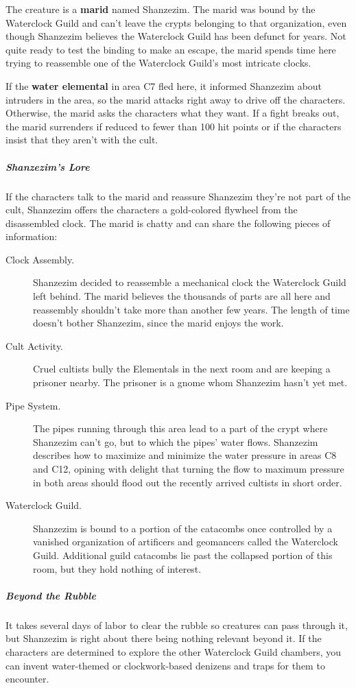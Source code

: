 \documentclass[10pt,a4paper,twoside,bg=print,twocolumn,openany,nodeprecatedcode]{dndbook}
\begin{document}
The creature is a \textbf{marid} named Shanzezim. The marid was bound by the Waterclock Guild and can't leave the crypts belonging to that organization, even though Shanzezim believes the Waterclock Guild has been defunct for years. Not quite ready to test the binding to make an escape, the marid spends time here trying to reassemble one of the Waterclock Guild's most intricate clocks.

If the \textbf{water elemental} in area C7 fled here, it informed Shanzezim about intruders in the area, so the marid attacks right away to drive off the characters. Otherwise, the marid asks the characters what they want. If a fight breaks out, the marid surrenders if reduced to fewer than 100 hit points or if the characters insist that they aren't with the cult.

\subparagraph{Shanzezim's Lore}
If the characters talk to the marid and reassure Shanzezim they're not part of the cult, Shanzezim offers the characters a gold-colored flywheel from the disassembled clock. The marid is chatty and can share the following pieces of information:


\begin{description}
\item[Clock Assembly.]
Shanzezim decided to reassemble a mechanical clock the Waterclock Guild left behind. The marid believes the thousands of parts are all here and reassembly shouldn't take more than another few years. The length of time doesn't bother Shanzezim, since the marid enjoys the work.
\item[Cult Activity.]
Cruel cultists bully the Elementals in the next room and are keeping a prisoner nearby. The prisoner is a gnome whom Shanzezim hasn't yet met.
\item[Pipe System.]
The pipes running through this area lead to a part of the crypt where Shanzezim can't go, but to which the pipes' water flows. Shanzezim describes how to maximize and minimize the water pressure in areas C8 and C12, opining with delight that turning the flow to maximum pressure in both areas should flood out the recently arrived cultists in short order.
\item[Waterclock Guild.]
Shanzezim is bound to a portion of the catacombs once controlled by a vanished organization of artificers and geomancers called the Waterclock Guild. Additional guild catacombs lie past the collapsed portion of this room, but they hold nothing of interest.
\end{description}

\subparagraph{Beyond the Rubble}
It takes several days of labor to clear the rubble so creatures can pass through it, but Shanzezim is right about there being nothing relevant beyond it. If the characters are determined to explore the other Waterclock Guild chambers, you can invent water-themed or clockwork-based denizens and traps for them to encounter.
\end{document}
